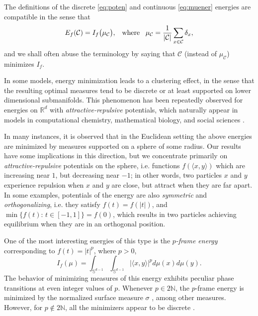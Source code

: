 \documentclass[11pt, leqno]{amsart}
\def\N{\mathbb N}
\def\S{\mathbb S}
\theoremstyle{definition}
\numberwithin{equation}{section}
\begin{document}
The definitions of the discrete  \eqref{eq:poten} and continuous \eqref{eq:muener} energies are compatible in the sense that 
\begin{equation}\label{eq:trans}
E_f (\mathcal C) =  I_f \big(\mu_{\mathcal C}   \big), \,\,\,\textup{ where }\,\,\, \mu_{\mathcal C} = \frac{1}{|\mathcal C|}  \sum_{x\in \mathcal C } \delta_x,
\end{equation}
and we shall often abuse the terminology by saying that $\mathcal C$ (instead of $\mu_{\mathcal C}$) minimizes $I_f$.  


In some  models, energy minimization leads to a clustering effect, in the sense that the resulting optimal measures tend to be discrete or at least supported on lower dimensional submanifolds. This phenomenon has been repeatedly observed for energies on $\mathbb R^d$ with {\em attractive-repulsive} potentials, which naturally appear in models in computational chemistry, mathematical biology, and social sciences \cite{balague2013nonlocal,carrillo2017geometry,carrillo2003kinetic,kangkim,kolokolnikov2011stability,mogilner2003mutual,von2012predicting,wu2015nonlocal}. 

In many instances, it is observed that in the Euclidean setting the above energies are minimized by measures supported on a sphere of some radius. Our results have some implications in this direction, but we concentrate primarily  on {\em{attractive-repulsive}} potentials on the sphere, i.e. functions $f( \langle x, y \rangle)$ which are increasing near $1$, but decreasing near $-1$; in other words,   two particles  $x$ and $y$ experience repulsion when $x$ and $y$ are close, but attract when they are far apart. In some  examples, potentials of the energy are also   {\em{symmetric}} and {\em{orthogonalizing}}, i.e. they satisfy $ f(t) = f(|t|)$, and $\min \{ f(t):\, t\in [-1,1] \} = f(0)$, which  results in two particles achieving equilibrium when they are in an orthogonal position. 


One of the most interesting energies of this type is the {\em{$p$-frame energy}} corresponding to $f (t) = |t|^p$, where $p>0$, 
\begin{equation}\label{eq:pframe}
    I_{f}(\mu)=\int_{\S^{d-1}}\int_{\S^{d-1}} |\langle x,y \rangle|^{p} d\mu(x)d\mu(y).
\end{equation} 
The behavior of minimizing measures of this energy exhibits peculiar phase transitions at  even integer values of $p$. Whenever $p\in 2 \N$, the $p$-frame energy is minimized by the normalized surface measure $\sigma$ \cite{sidel1974new,Ehler2012}, among other measures.  However, for $p\not\in 2\N$,  all the minimizers appear to be discrete \cite{BGMPV}. 
\end{document}
